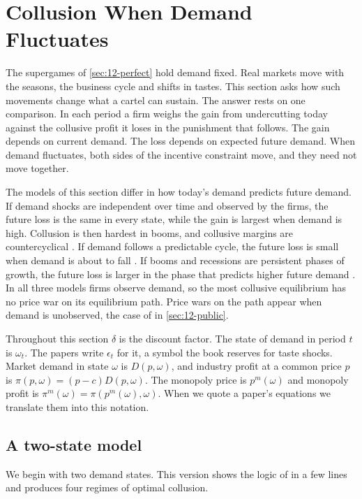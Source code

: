 \section{Collusion When Demand Fluctuates}\label{sec:12-demand}

The supergames of \cref{sec:12-perfect} hold demand fixed. Real markets move with the seasons, the business cycle
and shifts in tastes. This section asks how such movements change what a cartel can sustain. The answer rests on
one comparison. In each period a firm weighs the gain from undercutting today against the collusive profit it loses
in the punishment that follows. The gain depends on current demand. The loss depends on expected future demand.
When demand fluctuates, both sides of the incentive constraint move, and they need not move together.

The models of this section differ in how today's demand predicts future demand. If demand shocks are independent
over time and observed by the firms, the future loss is the same in every state, while the gain is largest when
demand is high. Collusion is then hardest in booms, and collusive margins are countercyclical
\citep{RotembergSaloner1986}. If demand follows a predictable cycle, the future loss is small when demand is about
to fall \citep{HaltiwangerHarrington1991}. If booms and recessions are persistent phases of growth, the future loss
is larger in the phase that predicts higher future demand \citep{BagwellStaiger1997}. In all three models firms
observe demand, so the most collusive equilibrium has no price war on its equilibrium path. Price wars on the path
appear when demand is unobserved, the case of \citet{GreenPorter1984} in \cref{sec:12-public}.

Throughout this section $\delta$ is the discount factor. The state of demand in period $t$ is $\omega_t$. The
papers write $\epsilon_t$ for it, a symbol the book reserves for taste shocks. Market demand in state $\omega$ is
$D(p,\omega)$, and industry profit at a common price $p$ is $\pi(p,\omega) = (p-c)D(p,\omega)$. The monopoly price is
$p^m(\omega)$ and monopoly profit is $\pi^m(\omega) = \pi(p^m(\omega),\omega)$. When we quote a paper's equations we
translate them into this notation.

\subsection{A two-state model}\label{sec:12-rs-two-state}

We begin with two demand states. This version shows the logic of \citet{RotembergSaloner1986} in a few lines and
produces four regimes of optimal collusion.

